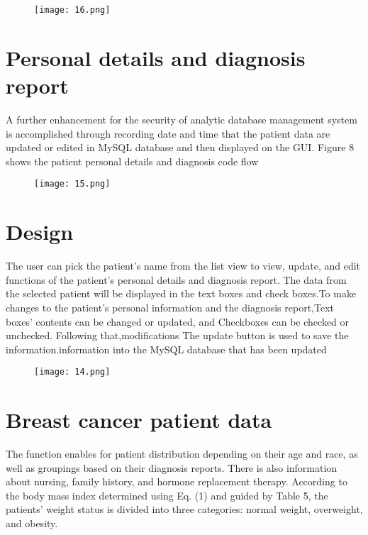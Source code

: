 \documentclass[10pt,a4paper,twoside]{article}
\begin{document}
\begin{figure}
  \texttt{[image: 16.png]}
  
  
  
\end{figure}

\section{Personal details and diagnosis report}

A further enhancement for the security of analytic database
management system is accomplished through recording
date and time that the patient data are updated or edited in
MySQL database and then displayed on the GUI. Figure 8
shows the patient personal details and diagnosis code flow

\begin{figure}
  \texttt{[image: 15.png]}
  
  
  
\end{figure}

\section{Design}
The user can pick the patient's name from the list view to view, update, and edit functions of the patient's personal details and diagnosis report. The data from the selected patient will be displayed in the text boxes and check boxes.To make changes to the patient's personal information and the diagnosis report,Text boxes' contents can be changed or updated, and Checkboxes can be checked or unchecked. Following that,modifications The update button is used to save the information.information into the MySQL database that has been updated

\begin{figure}
  \texttt{[image: 14.png]}
  
  
  
\end{figure}

\section{Breast cancer patient data}

The function enables for patient distribution depending on their age and race, as well as groupings based on their diagnosis reports. There is also information about nursing, family history, and hormone replacement therapy. According to the body mass index determined using Eq. (1) and guided by Table 5, the patients' weight status is divided into three categories: normal weight, overweight, and obesity.
\end{document}
